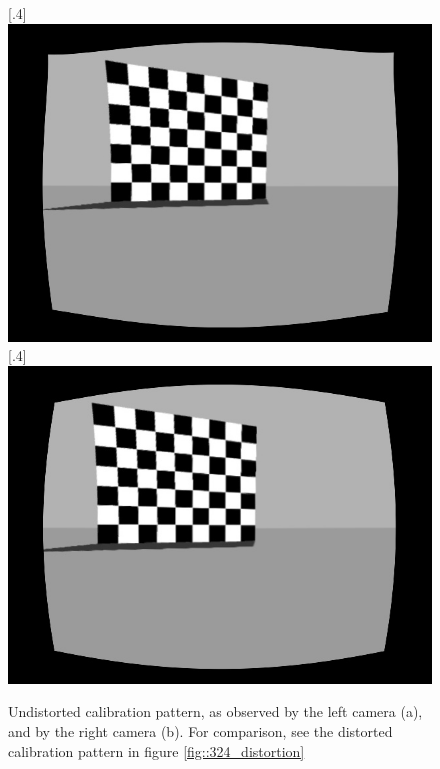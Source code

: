 \begin{figure}[h]
	\centering
	\subcaptionbox{}%
	[.4\linewidth]{\includegraphics[scale=.2]{chapters/03_background/img/gazebo_rectified_left.jpg}}
	\subcaptionbox{}%
	[.4\linewidth]{\includegraphics[scale=.2]{chapters/03_background/img/gazebo_rectified_right.jpg}}
	\caption{Undistorted calibration pattern, as observed by the left camera (a), and by the right camera (b). For comparison, see the distorted calibration pattern in figure \ref{fig::324_distortion}}
	\label{fig::324_rectified}
\end{figure}
